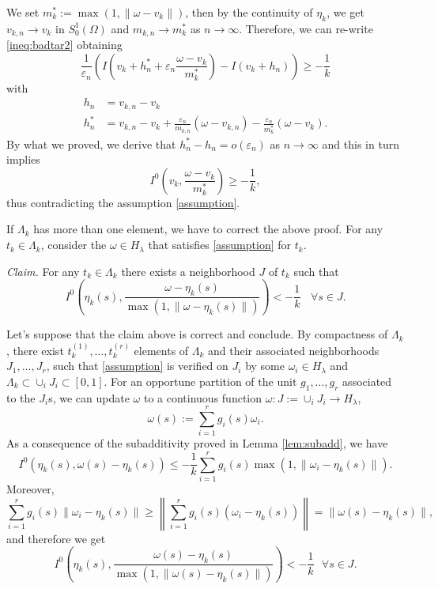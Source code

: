 \documentclass[11pt]{amsart}
\numberwithin{equation}{section} %
\theoremstyle{definition}
\newcommand{\cor}{\textit}
\begin{document}
We set $m_k^*:=\max(1,\|\omega-v_k\|)$, then
by the continuity of $\eta_k$,  we get
$v_{k,n}\to v_k$ in $S^1_0(\Omega)$ and $m_{k,n}\to m_k^*$
as $n\to\infty$.
Therefore, we can re-write \eqref{ineq:badtar2} obtaining
\[
\frac{1}{\varepsilon_n}\left(I\left(v_k+h_n^*+\varepsilon_n \frac{\omega-v_k}{m_k^*}\right)-I(v_k+h_n)\right)\geq-\frac{1}{k}
\]
with
\begin{align*}
	h_n&=v_{k,n}-v_k\\
	h_n^*&=v_{k,n}-v_k+\frac{\varepsilon_n}{m_{k,n}}(\omega-v_{k,n})-\frac{\varepsilon_n}{m_k^*}(\omega-v_k).
\end{align*}
By what we proved, we derive that $h_n^*-h_n=o(\varepsilon_n)$ as $n\to\infty$ and
this in turn implies
\[
I^0\left(v_k,\frac{\omega-v_k}{m_k^*}\right)\geq-\frac{1}{k},
\]
thus contradicting the assumption \eqref{assumption}.\newline

If $\Lambda_k$ has more than one element, we have to correct the above proof.
For any $t_k\in \Lambda_k$, consider the $\omega\in H_\lambda$
that satisfies \eqref{assumption} for $t_k$.\newline

\cor{Claim.} 
For any $t_k\in \Lambda_k$ there exists a neighborhood
$J$ of $t_k$ such that
\begin{equation}\label{assumption2}
	I^0\left(\eta_k(s),\frac{\omega-\eta_k(s)}{\max(1,\|\omega-\eta_k(s)\|)}\right)<-\frac{1}{k}\ \ \ \ \forall s\in J.
\end{equation}\newline

Let's suppose that the claim above is correct and conclude.
By compactness of $\Lambda_k$, there exist $t_k^{(1)},\dots,t_k^{(r)}$ elements of $\Lambda_k$
and their associated neighborhoods $J_1,\dots,J_r$, such that
\eqref{assumption} is verified on $J_i$ by some $\omega_i\in H_\lambda$ 
and $\Lambda_k\subset \cup_i J_i\subset [0,1]$.
For an opportune partition of the unit $g_1,\dots,g_r$ associated to the $J_i$s,
we can update $\omega$ to a continuous function $\omega\colon J:=\cup_iJ_i\to H_\lambda$,
\[
\omega(s):=\sum_{i=1}^rg_i(s)\omega_i.
\]
As a consequence of the subadditivity proved in Lemma \ref{lem:subadd},
we have
\[
I^0(\eta_k(s),\omega(s)-\eta_k(s))\leq -\frac{1}{k} \sum_{i = 1}^r g_i(s) \max(1,\|\omega_i-\eta_k(s)\|).
\]
Moreover,
\[
\sum_{i = 1}^r g_i(s)\|\omega_i-\eta_k(s)\|\geq \left\|\sum_{i = 1}^r g_i(s)(\omega_i-\eta_k(s))\right\|=\|\omega(s)-\eta_k(s)\|,
\]
and therefore we get
\begin{equation}\label{assumption3}
	I^0\left(\eta_k(s),\frac{\omega(s)-\eta_k(s)}{\max(1,\|\omega(s)-\eta_k(s)\|)}\right)<-\frac{1}{k}\ \ \ \forall s\in J.
\end{equation}
\end{document}
